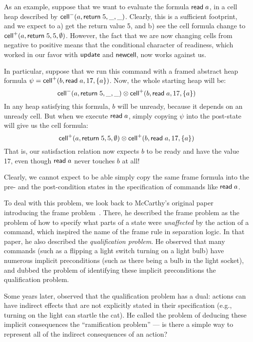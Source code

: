\documentclass[preprint,natbib]{sigplanconf}
\begin{document}
As an example, suppose that we want to evaluate the formula $\mbox{\textsf{{read}}}\;
a$, in a cell heap described by $\mbox{\textsf{{cell}}}^{-}({a}, {\mbox{\textsf{{return}}}\; 5}, {\_}, {\_})$.  Clearly,
this is a sufficient footprint, and we expect to a) get the return
value 5, and b) see the cell formula change to $\mbox{\textsf{{cell}}}^{+}({a}, {\mbox{\textsf{{return}}}\;
  5}, {5}, {\emptyset})$.  However, the fact that we are now changing cells
from negative to positive means that the conditional character of
readiness, which worked in our favor with $\mbox{\textsf{{update}}}$ and
$\mbox{\textsf{{newcell}}}\;\!\!$, now works against us.

In particular, suppose that we run this command with a framed abstract heap
formula $\psi = \mbox{\textsf{{cell}}}^{+}({b}, {\mbox{\textsf{{read}}}\; a}, {17}, {\{{a}\}})$. Now, the
whole starting heap will be:
\begin{displaymath}
\mbox{\textsf{{cell}}}^{-}({a}, {\mbox{\textsf{{return}}}\; 5}, {\_}, {\_}) \otimes \mbox{\textsf{{cell}}}^{+}({b}, {\mbox{\textsf{{read}}}\; a}, {17}, {\{{a}\}})  
\end{displaymath}
In any heap satisfying this formula, $b$ will be unready, because it depends 
on an unready cell. But when we execute $\mbox{\textsf{{read}}}\; a$, simply copying $\psi$ 
into the post-state will give us the cell formula:
\begin{displaymath}
\mbox{\textsf{{cell}}}^{+}({a}, {\mbox{\textsf{{return}}}\; 5}, {5}, {\emptyset}) \otimes \mbox{\textsf{{cell}}}^{+}({b}, {\mbox{\textsf{{read}}}\; a}, {17}, {\{{a}\}})
\end{displaymath}
That is, our satisfaction relation now expects $b$ to be ready and have the 
value 17, even though $\mbox{\textsf{{read}}}\; a$ never touches $b$ at all!

Clearly, we cannot expect to be able simply copy the same frame formula into 
the pre- and the post-condition states in the specification of commands like 
$\mbox{\textsf{{read}}}\; a$. 

To deal with this problem, we look back to McCarthy's original paper
introducing the frame problem~\cite{mccarthy}. There, he described the
frame problem as the problem of how to specify what parts of a state
were \emph{unaffected} by the action of a command, which inspired the
name of the frame rule in separation logic. In that paper, he also
described the \emph{qualification problem}. He observed that many
commands (such as a flipping a light switch turning on a light bulb)
have numerous implicit preconditions (such as there being a bulb in
the light socket), and dubbed the problem of identifying these
implicit preconditions the qualification problem. 

Some years later, \citet{finger} observed that the qualification
problem has a dual: actions can have indirect effects that are not
explicitly stated in their specification (e.g., turning on the light can
startle the cat). He called the problem of deducing these implicit
consequences the ``ramification problem'' --- is there a simple way to
represent all of the indirect consequences of an action?
\end{document}
